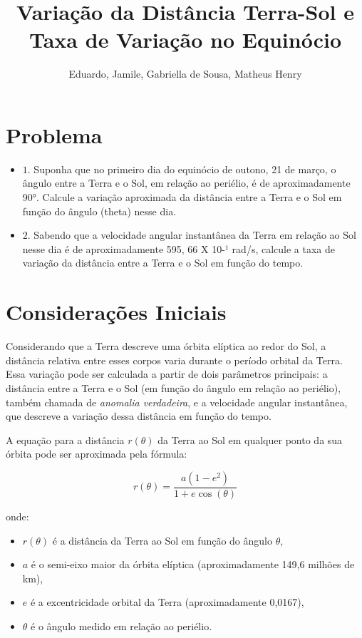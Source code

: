 \documentclass[portuguese,12pt,a4paper,onecolumn]{article}
\begin{document}
	
	\title{Variação da Distância Terra-Sol e Taxa de Variação no Equinócio}
	\author{Eduardo, Jamile, Gabriella de Sousa, Matheus Henry}
	\date{}
	\maketitle
	
	\section{Problema}
	
	\begin{itemize}
		\item \( 1. \) Suponha que no primeiro dia do equinócio de outono, 21 de março, o ângulo entre a Terra e o Sol, em relação ao periélio, é de aproximadamente 90°. Calcule a variação aproximada da distância entre a Terra e o Sol em função do ângulo (theta) nesse dia.
		\item \( 2. \) Sabendo que a velocidade angular instantânea da Terra em relação ao Sol nesse dia é de aproximadamente 595, 66 X 10-¹ rad/s, calcule a taxa de variação da distância entre a Terra e o Sol em função do tempo.
	\end{itemize}
	
	\section{Considerações Iniciais}
	
	Considerando que a Terra descreve uma órbita elíptica ao redor do Sol, a distância relativa entre esses corpos varia durante o período orbital da Terra. Essa variação pode ser calculada a partir de dois parâmetros principais: a distância entre a Terra e o Sol (em função do ângulo em relação ao periélio), também chamada de \textit{anomalia verdadeira}, e a velocidade angular instantânea, que descreve a variação dessa distância em função do tempo.
	
	A equação para a distância \( r(\theta) \) da Terra ao Sol em qualquer ponto da sua órbita pode ser aproximada pela fórmula:
	
	\[
	r(\theta) = \frac{a(1 - e^2)}{1 + e \cos(\theta)}
	\]
	
	onde:
	\begin{itemize}
		\item \( r(\theta) \) é a distância da Terra ao Sol em função do ângulo \( \theta \),
		\item \( a \) é o semi-eixo maior da órbita elíptica (aproximadamente 149,6 milhões de km),
		\item \( e \) é a excentricidade orbital da Terra (aproximadamente 0,0167),
		\item \( \theta \) é o ângulo medido em relação ao periélio.
	\end{itemize}
	
\end{document}
